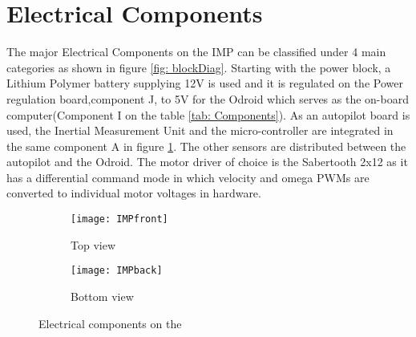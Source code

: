 \section{Electrical Components}
The major Electrical Components on the IMP can be classified under 4 main categories as shown in figure \ref{fig: blockDiag}. Starting with the power block, a Lithium Polymer battery supplying 12V is used and it is regulated on the Power regulation board,component J, to 5V for the Odroid which serves as the on-board computer(Component I on the table \ref{tab: Components}). As an autopilot board is used, the Inertial Measurement Unit and the micro-controller are integrated in the same component A in figure \ref{fig:IMPfront}. The other sensors are distributed between the autopilot and the Odroid. The motor driver of choice is the Sabertooth 2x12 as it has a differential command mode in which velocity and omega PWMs are converted to individual motor voltages in hardware. 

\begin{figure}[h!]
    \centering
    \begin{subfigure}[b]{0.4\textwidth}
	    \texttt{[image: IMPfront]}
	    \caption{Top view}
	    \label{fig:IMPfront}
    \end{subfigure}
    \quad %
    \begin{subfigure}[b]{0.3\textwidth}
		\texttt{[image: IMPback]}
		\caption{Bottom view}
		\label{fig:IMPback}
    \end{subfigure}%
    \caption{Electrical components on the \imp}
    \label{fig:IMPparts}
\end{figure}

